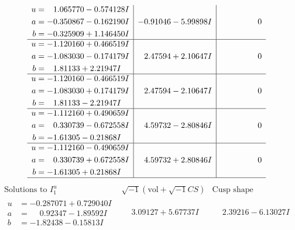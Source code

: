 \documentclass[1p]{elsarticle_modified}
\theoremstyle{definition}
\newcommand{\I}{\sqrt{-1}}
\begin{document}
$$\begin{array}{c|c|c}
\begin{aligned}
u &= \phantom{-}1.065770 - 0.574128 I \\
a &= -0.350867 - 0.162190 I \\
b &= -0.325909 + 1.146450 I\end{aligned}
 & -0.91046 - 5.99898 I & \phantom{-0.000000 } 0 \\ \hline\begin{aligned}
u &= -1.120160 + 0.466519 I \\
a &= -1.083030 - 0.174179 I \\
b &= \phantom{-}1.81133 + 2.21947 I\end{aligned}
 & \phantom{-}2.47594 + 2.10647 I & \phantom{-0.000000 } 0 \\ \hline\begin{aligned}
u &= -1.120160 - 0.466519 I \\
a &= -1.083030 + 0.174179 I \\
b &= \phantom{-}1.81133 - 2.21947 I\end{aligned}
 & \phantom{-}2.47594 - 2.10647 I & \phantom{-0.000000 } 0 \\ \hline\begin{aligned}
u &= -1.112160 + 0.490659 I \\
a &= \phantom{-}0.330739 - 0.672558 I \\
b &= -1.61305 - 0.21868 I\end{aligned}
 & \phantom{-}4.59732 - 2.80846 I & \phantom{-0.000000 } 0 \\ \hline\begin{aligned}
u &= -1.112160 - 0.490659 I \\
a &= \phantom{-}0.330739 + 0.672558 I \\
b &= -1.61305 + 0.21868 I\end{aligned}
 & \phantom{-}4.59732 + 2.80846 I & \phantom{-0.000000 } 0\\
 \hline 
 \end{array}$$\newpage$$\begin{array}{c|c|c}  
\text{Solutions to }I^u_{1}& \I (\text{vol} + \sqrt{-1}CS) & \text{Cusp shape}\\
 \hline 
\begin{aligned}
u &= -0.287071 + 0.729040 I \\
a &= \phantom{-}0.92347 - 1.89592 I \\
b &= -1.82438 - 0.15813 I\end{aligned}
 & \phantom{-}3.09127 + 5.67737 I & \phantom{-}2.39216 - 6.13027 I \\ \hline\begin{aligned}

\end{aligned}
\end{array}$$
\end{document}
